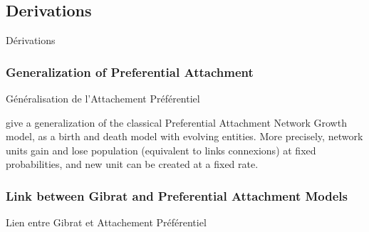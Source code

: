 



\subsection{Derivations}{Dérivations}

\subsubsection{Generalization of Preferential Attachment}{Généralisation de l'Attachement Préférentiel}

\cite{yamasaki2006preferential} give a generalization of the classical Preferential Attachment Network Growth model, as a birth and death model with evolving entities. More precisely, network units gain and lose population (equivalent to links connexions) at fixed probabilities, and new unit can be created at a fixed rate.

\subsubsection{Link between Gibrat and Preferential Attachment Models}{Lien entre Gibrat et Attachement Préférentiel}



